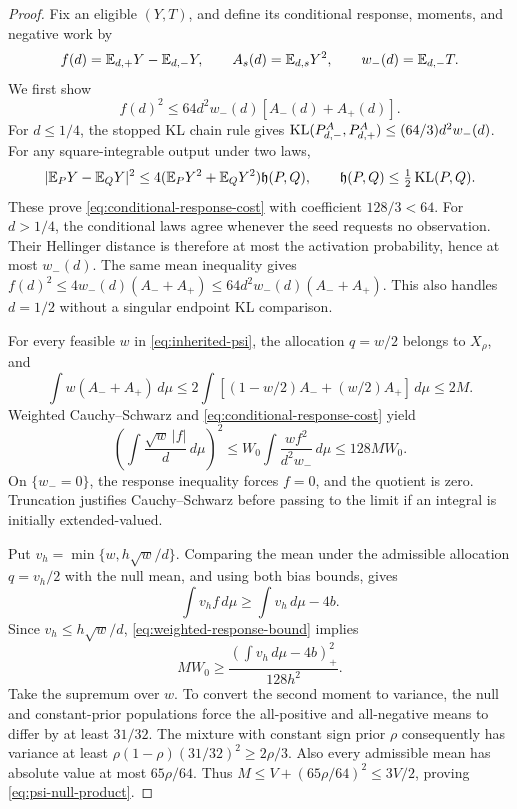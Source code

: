 \begin{proof}
Fix an eligible \((Y,T)\), and define its conditional response, moments,
and negative work by
\[
 f(d)=\mathbb E_{d,+}Y-\mathbb E_{d,-}Y,\qquad
 A_s(d)=\mathbb E_{d,s}Y^2,\qquad w_-(d)=\mathbb E_{d,-}T.
\]
We first show
\begin{equation}
 f(d)^2\le64d^2w_-(d)[A_-(d)+A_+(d)].
 \label{eq:conditional-response-cost}
\end{equation}
For \(d\le1/4\), the stopped KL chain rule gives
\(\operatorname{KL}(P_{d,-}^A,P_{d,+}^A)\le(64/3)d^2w_-(d)\).
For any square-integrable output under two laws,
\[
 |\mathbb E_PY-\mathbb E_QY|^2
 \le4(\mathbb E_PY^2+\mathbb E_QY^2)\mathfrak h(P,Q),\qquad
 \mathfrak h(P,Q)\le\tfrac12\operatorname{KL}(P,Q).
\]
These prove \eqref{eq:conditional-response-cost} with coefficient
\(128/3<64\).  For \(d>1/4\), the conditional laws agree whenever
the seed requests no observation.  Their Hellinger distance is therefore
at most the activation probability, hence at most \(w_-(d)\).
The same mean inequality gives
\(f(d)^2\le4w_-(d)(A_-+A_+)\le64d^2w_-(d)(A_-+A_+)\).
This also handles \(d=1/2\) without a singular endpoint KL comparison.

For every feasible \(w\) in \eqref{eq:inherited-psi}, the allocation
\(q=w/2\) belongs to \(X_\rho\), and
\[
 \int w(A_-+A_+)\,d\mu
 \le2\int[(1-w/2)A_-+(w/2)A_+]\,d\mu\le2M.
\]
Weighted Cauchy--Schwarz and \eqref{eq:conditional-response-cost} yield
\begin{equation}
 \left(\int\frac{\sqrt w\,|f|}{d}\,d\mu\right)^2
 \le W_0\int\frac{wf^2}{d^2w_-}\,d\mu
 \le128MW_0.
 \label{eq:weighted-response-bound}
\end{equation}
On \(\{w_-=0\}\), the response inequality forces \(f=0\), and the
quotient is zero.  Truncation justifies Cauchy--Schwarz before passing to
the limit if an integral is initially extended-valued.

Put \(v_h=\min\{w,h\sqrt w/d\}\).  Comparing the mean under the
admissible allocation \(q=v_h/2\) with the null mean, and using both
bias bounds, gives
\[
 \int v_h f\,d\mu\ge\int v_h\,d\mu-4b.
\]
Since \(v_h\le h\sqrt w/d\),
\eqref{eq:weighted-response-bound} implies
\[
 MW_0\ge\frac{(\int v_h\,d\mu-4b)_+^2}{128h^2}.
\]
Take the supremum over \(w\).  To convert the second moment to variance,
the null and constant-prior populations force the all-positive and
all-negative means to differ by at least \(31/32\).  The mixture with
constant sign prior \(\rho\) consequently has variance at least
\(\rho(1-\rho)(31/32)^2\ge2\rho/3\).  Also every admissible mean has
absolute value at most \(65\rho/64\).  Thus
\(M\le V+(65\rho/64)^2\le3V/2\), proving
\eqref{eq:psi-null-product}.
\end{proof}

